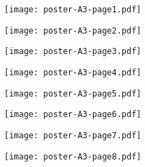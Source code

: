 \documentclass{article}
\begin{document}
\begin{center}
\texttt{[image: poster-A3-page1.pdf]}
\end{center}
\newpage
\begin{center}
\texttt{[image: poster-A3-page2.pdf]}
\end{center}
\newpage
\begin{center}
\texttt{[image: poster-A3-page3.pdf]}
\end{center}
\newpage
\begin{center}
\texttt{[image: poster-A3-page4.pdf]}
\end{center}
\newpage
\begin{center}
\texttt{[image: poster-A3-page5.pdf]}
\end{center}
\newpage
\begin{center}
\texttt{[image: poster-A3-page6.pdf]}
\end{center}
\newpage
\begin{center}
\texttt{[image: poster-A3-page7.pdf]}
\end{center}
\newpage
\begin{center}
\texttt{[image: poster-A3-page8.pdf]}
\end{center}
\end{document}
